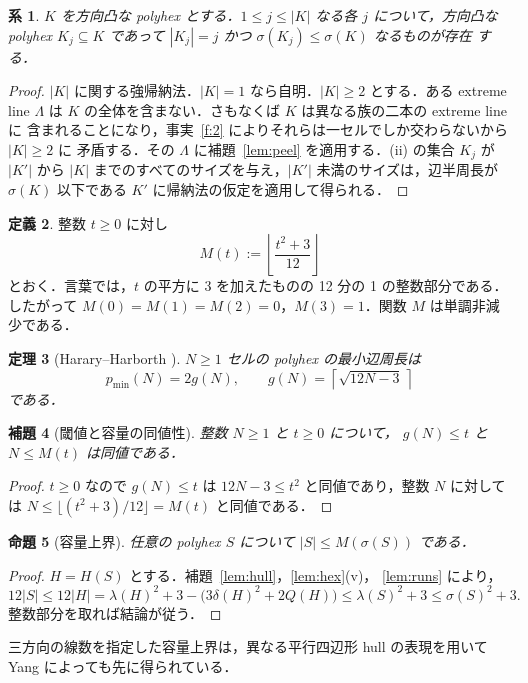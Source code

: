 \documentclass[11pt]{article}
\theoremstyle{plain}
\newtheorem{theorem}{定理}[section]
\newtheorem{lemma}[theorem]{補題}
\newtheorem{proposition}[theorem]{命題}
\newtheorem{corollary}[theorem]{系}
\theoremstyle{definition}
\newtheorem{definition}[theorem]{定義}
\theoremstyle{remark}
\begin{document}
\begin{corollary}\label{cor:subsets}
\(K\) を方向凸な polyhex とする．\(1\le j\le|K|\) なる各 \(j\) について，方向凸な polyhex
\(K_{j}\subseteq K\) であって \(|K_{j}|=j\) かつ \(\sigma(K_{j})\le\sigma(K)\) なるものが存在
する．
\end{corollary}

\begin{proof}
\(|K|\) に関する強帰納法．\(|K|=1\) なら自明．\(|K|\ge2\) とする．ある extreme line
\(\Lambda\) は \(K\) の全体を含まない．さもなくば \(K\) は異なる族の二本の extreme line に
含まれることになり，事実~\ref{f:2} によりそれらは一セルでしか交わらないから \(|K|\ge2\) に
矛盾する．その \(\Lambda\) に補題~\ref{lem:peel} を適用する．(ii) の集合 \(K_{j}\) が
\(|K'|\) から \(|K|\) までのすべてのサイズを与え，\(|K'|\) 未満のサイズは，辺半周長が
\(\sigma(K)\) 以下である \(K'\) に帰納法の仮定を適用して得られる．
\end{proof}

\begin{definition}\label{def:M}
整数 \(t\ge0\) に対し
\[
   M(t):=\left\lfloor\frac{t^{2}+3}{12}\right\rfloor
\]
とおく．言葉では，\(t\) の平方に 3 を加えたものの 12 分の 1 の整数部分である．したがって
\(M(0)=M(1)=M(2)=0\)，\(M(3)=1\)．関数 \(M\) は単調非減少である．
\end{definition}

\begin{theorem}[Harary--Harborth \cite{HararyHarborth1976}]\label{thm:knownperimeter}
\(N\ge1\) セルの polyhex の最小辺周長は
\[
p_{\min}(N)=2g(N),\qquad
g(N)=\left\lceil\sqrt{12N-3}\,\right\rceil
\]
である．
\end{theorem}

\begin{lemma}[閾値と容量の同値性]\label{lem:cap-equiv}
整数 \(N\ge1\) と \(t\ge0\) について，
\(g(N)\le t\) と \(N\le M(t)\) は同値である．
\end{lemma}
\begin{proof}
\(t\ge0\) なので \(g(N)\le t\) は \(12N-3\le t^2\)
と同値であり，整数 \(N\) に対しては
\(N\le\lfloor(t^2+3)/12\rfloor=M(t)\) と同値である．
\end{proof}

\begin{proposition}[容量上界]\label{pro:capacity-bound}
任意の polyhex \(S\) について \(|S|\le M(\sigma(S))\) である．
\end{proposition}
\begin{proof}
\(H=H(S)\) とする．補題~\ref{lem:hull}，\ref{lem:hex}(v)，
\ref{lem:runs} により，
\[
12|S|\le12|H|
=\lambda(H)^2+3-\bigl(3\delta(H)^2+2Q(H)\bigr)
\le\lambda(S)^2+3\le\sigma(S)^2+3 .
\]
整数部分を取れば結論が従う．
\end{proof}
三方向の線数を指定した容量上界は，異なる平行四辺形 hull の表現を用いて
Yang \cite[Theorem~7]{Yang2002} によっても先に得られている．
\end{document}
